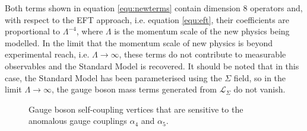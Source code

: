 Both terms shown in equation \ref{equ:newterms} contain dimension 8 operators \cite{Degrande:2013rea} and, with respect to the EFT approach, i.e. equation \ref{equ:eft}, their coefficients are proportional to $\Lambda^{-4}$, where $\Lambda$ is the momentum scale of the new physics being modelled.  In the limit that the momentum scale of new physics is beyond experimental reach, i.e. $\Lambda \rightarrow \infty$, these terms do not contribute to measurable observables and the Standard Model is recovered.  It should be noted that in this case, the Standard Model has been parameterised using the $\Sigma$ field, so in the limit $\Lambda \rightarrow \infty$, the gauge boson mass terms generated from $\mathcal{L}_{\Sigma}$ do not vanish.  

\begin{figure}[h!]
\caption[Gauge boson self-coupling vertices that are sensitive to the anomalous gauge couplings $\alpha_{4}$ and $\alpha_{5}$.]{Gauge boson self-coupling vertices that are sensitive to the anomalous gauge couplings $\alpha_{4}$ and $\alpha_{5}$.}
\label{fig:agcvertices}
\end{figure}
